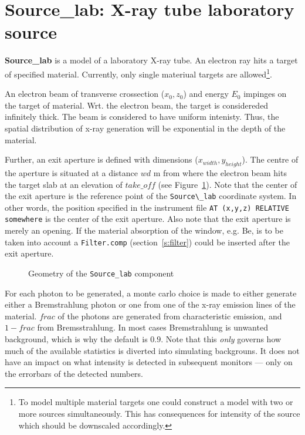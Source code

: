 \section{Source\_lab: X-ray tube laboratory source}
\label{s:source-div}


{\bf Source\_lab} is a model of a laboratory X-ray tube. An electron ray hits a
target of specified material. Currently, only single materiual targets are
allowed\footnote{To model multiple material targets one could construct a model with two
or more sources simultaneously. This has consequences for intensity of the source which should be downscaled accordingly.}.

An electron beam of transverse crossection ($x_0,z_0$) and energy $E_0$
impinges on the target of material. Wrt. the electron beam, the target is
considereded infinitely thick. The beam is considered to have uniform
intenisty. Thus, the spatial distribution of x-ray generation will be
exponential in the depth of the material.

Further, an exit aperture is defined with dimensions ($x_{width},y_{height}$). The centre of the aperture is situated at a distance $wd$ m from where the electron beam hits the target slab at an elevation of $take\_off$ (see Figure~\ref{f:source_lab}).  
Note that the center of the exit aperture is the reference point of the
\verb+Source\_lab+ coordinate system. In other words, the position specified in
the instrument file \verb+AT (x,y,z) RELATIVE somewhere+ is the center of the
exit aperture. Also note that the exit aperture is merely an opening. If the material absorption of the window, e.g. Be, is to be taken into account a \verb+Filter.comp+ (section~\ref{s:filter}) could be inserted after the exit aperture. 

\begin{figure}
\label{f:source_lab}
\caption{Geometry of the \texttt{Source\_lab} component} 
\end{figure}

For each photon to be generated, a monte carlo choice is made to either
generate either a Bremstrahlung photon or one from one of the x-ray emission
lines of the material. $frac$ of the photons are generated from characteristic
emission, and $1-frac$ from Bremsstrahlung. In most cases Bremstrahlung is
unwanted background, which is why the default is $0.9$. Note that this
\emph{only} governs how much of the available statistics is diverted into
simulating backgrouns. It does not have an impact on what intensity is detected
in subsequent monitors --- only on the errorbars of the detected numbers.

